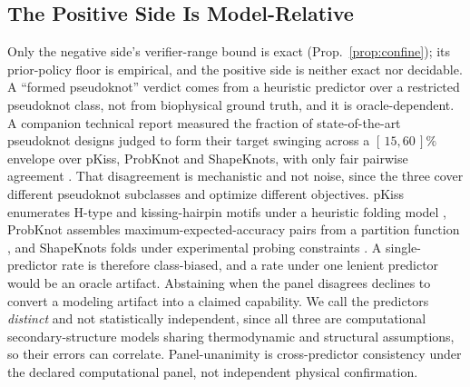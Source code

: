 \documentclass[11pt]{article}
\newcommand{\citecompanion}{\citep{verifiereconomicsanon}}
\newcommand{\Ourcompanion}{A companion technical report}
\newcommand{\citecompanion}{\citep{verifiereconomics}}
\newcommand{\Ourcompanion}{Our companion work}
\begin{document}
\subsection{The Positive Side Is Model-Relative}\label{sec:oracle}
Only the negative side's verifier-range bound is exact (Prop.~\ref{prop:confine}); its prior-policy floor is empirical, and the positive side is neither exact nor decidable. A ``formed pseudoknot'' verdict comes from a heuristic predictor
over a restricted pseudoknot class, not from biophysical ground truth, and it is oracle-dependent.
\Ourcompanion{} measured the fraction of state-of-the-art pseudoknot designs judged to form their target swinging
across a $[\,15,60\,]\%$ envelope over pKiss, ProbKnot and ShapeKnots, with only fair pairwise agreement
\citecompanion{}. That disagreement is mechanistic and not noise, since the three cover different
pseudoknot subclasses and optimize different objectives. pKiss enumerates H-type and kissing-hairpin motifs
under a heuristic folding model \citep{janssen2015pkiss}, ProbKnot assembles maximum-expected-accuracy pairs
from a partition function \citep{bellaousov2010probknot}, and ShapeKnots folds under experimental probing
constraints \citep{hajdin2013shapeknots}. A single-predictor rate is therefore class-biased, and a rate under
one lenient predictor would be an oracle artifact. Abstaining when the panel disagrees declines to convert a
modeling artifact into a claimed capability. We call the predictors \emph{distinct} and not statistically
independent, since all three are computational secondary-structure models sharing thermodynamic and
structural assumptions, so their errors can correlate. Panel-unanimity is cross-predictor consistency under
the declared computational panel, not independent physical confirmation.
\end{document}
